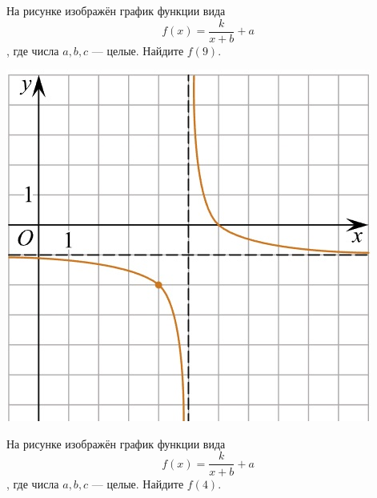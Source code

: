 \begin{class}[number=5]
\begin{listofex}
\begin{minipage}[t]{0.22\textwidth}
		\end{minipage}
		\item
		\begin{minipage}[t]{0.66\textwidth}
			На рисунке изображён график функции вида \[ f(x)=\dfrac{k}{x+b}+a \], где числа \(a, b, c\) --- целые. Найдите \(f(9)\).
		\end{minipage}
		\hspace{0.05\textwidth}
		\begin{minipage}[t]{0.22\textwidth}
			\includegraphics[align=t, width=\textwidth]{pics/G101M4C5-2.jpg}
		\end{minipage}
		\item
		\begin{minipage}[t]{0.66\textwidth}
			На рисунке изображён график функции вида \[ f(x)=\dfrac{k}{x+b}+a \], где числа \(a, b, c\) --- целые. Найдите \(f(4)\).
		\end{minipage}
		\hspace{0.05\textwidth}
		\begin{minipage}[t]{0.22\textwidth}

\end{minipage}
\end{listofex}
\end{class}
